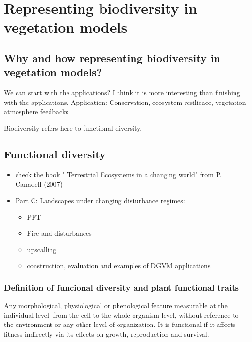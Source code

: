 \documentclass[12pt,oneside]{book}
\providecommand{\tightlist}{%
  \setlength{\itemsep}{0pt}\setlength{\parskip}{0pt}}
\begin{document}
\chapter{Representing biodiversity in vegetation
models}\label{representing-biodiversity-in-vegetation-models}


\section{Why and how representing biodiversity in vegetation
models?}\label{why-and-how-representing-biodiversity-in-vegetation-models}

We can start with the applications? I think it is more interesting than
finishing with the applications. Application: Conservation, ecosystem
resilience, vegetation-atmosphere feedbacks

Biodiversity refers here to functional diversity.

\section{Functional diversity}\label{functional-diversity}

\begin{itemize}
\tightlist
\item
  check the book " Terrestrial Ecosystems in a changing world" from P.
  Canadell (2007)
\item
  Part C: Landscapes under changing disturbance regimes:

  \begin{itemize}
  \tightlist
  \item
    PFT
  \item
    Fire and disturbances
  \item
    upscalling
  \item
    construction, evaluation and examples of DGVM applications
  \end{itemize}
\end{itemize}

\subsection{Definition of funcional diversity and plant functional
traits}\label{definition-of-funcional-diversity-and-plant-functional-traits}

Any morphological, physiological or phenological feature measurable at
the individual level, from the cell to the whole-organism level, without
reference to the environment or any other level of organization. It is
functional if it affects fitness indirectly via its effects on growth,
reproduction and survival.
\end{document}

